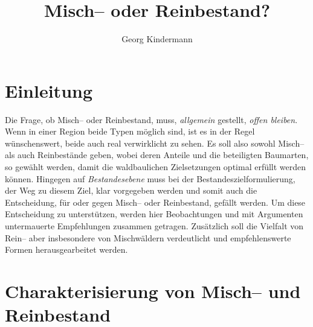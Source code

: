 \documentclass[twocolumn]{scrartcl}
\title{Misch-- oder Reinbestand?}
\author{Georg Kindermann}
\begin{document}

\tableofcontents

\section{Einleitung}

Die Frage, ob Misch-- oder Reinbestand, muss, \emph{allgemein} gestellt,
\emph{offen bleiben}. Wenn in einer Region beide Typen möglich sind, ist es in
der Regel wünschenswert, beide auch real verwirklicht zu sehen. Es soll also
sowohl Misch-- als auch Reinbestände geben, wobei deren Anteile und die
beteiligten Baumarten, so gewählt werden, damit die waldbaulichen Zielsetzungen
optimal erfüllt werden können. Hingegen auf \emph{Bestandesebene} muss bei der
Bestandeszielformulierung, der Weg zu diesem Ziel, klar vorgegeben werden und
somit auch die Entscheidung, für oder gegen Misch-- oder Reinbestand, gefällt
werden. Um diese Entscheidung zu unterstützen, werden hier Beobachtungen und mit
Argumenten untermauerte Empfehlungen zusammen getragen. Zusätzlich soll die
Vielfalt von Rein-- aber insbesondere von Mischwäldern verdeutlicht und
empfehlenswerte Formen herausgearbeitet werden.

\section{Charakterisierung von Misch-- und Reinbestand}
\label{sec:charakterisierung}
\end{document}
